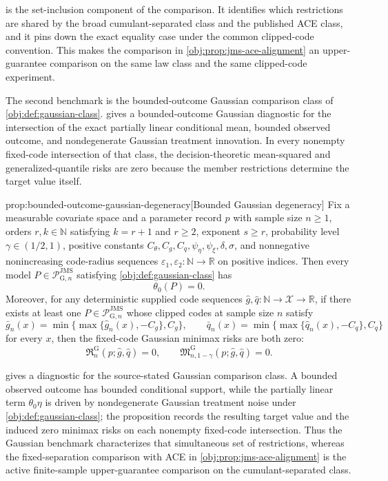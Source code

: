  is the set-inclusion component of the comparison. It identifies which restrictions are shared by the broad cumulant-separated class and the published ACE class, and it pins down the exact equality case under the common clipped-code convention. This makes the comparison in \cref{obj:prop:jms-ace-alignment} an upper-guarantee comparison on the same law class and the same clipped-code experiment.

The second benchmark is the bounded-outcome Gaussian comparison class of \cref{obj:def:gaussian-class}.  gives a bounded-outcome Gaussian diagnostic for the intersection of the exact partially linear conditional mean, bounded observed outcome, and nondegenerate Gaussian treatment innovation. In every nonempty fixed-code intersection of that class, the decision-theoretic mean-squared and generalized-quantile risks are zero because the member restrictions determine the target value itself.

\begin{propositionv}{prop:bounded-outcome-gaussian-degeneracy}[Bounded Gaussian degeneracy]
Fix a measurable covariate space and a parameter record \(p\) with sample size \(n\ge1\), orders \(r,k\in\mathbb N\) satisfying \(k=r+1\) and \(r\ge2\), exponent \(s\ge r\), probability level \(\gamma\in(1/2,1)\), positive constants \(C_{\theta},C_g,C_q,\psi_{\eta},\psi_{\xi},\delta,\sigma\), and nonnegative nonincreasing code-radius sequences \(\varepsilon_1,\varepsilon_2:\mathbb N\to\mathbb R\) on positive indices. Then every model \(P\in\mathcal P_{\mathrm G,n}^{\mathrm{JMS}}\) satisfying \cref{obj:def:gaussian-class} has
\[
\theta_0(P)=0.
\]
Moreover, for any deterministic supplied code sequences \(\widehat g,\widehat q:\mathbb N\to\mathcal X\to\mathbb R\), if there exists at least one \(P\in\mathcal P_{\mathrm G,n}^{\mathrm{JMS}}\) whose clipped codes at sample size \(n\) satisfy
\[
\bar g_n(x)=\min\{\max\{\widehat g_n(x),-C_g\},C_g\},
\qquad
\bar q_n(x)=\min\{\max\{\widehat q_n(x),-C_q\},C_q\}
\]
for every \(x\), then the fixed-code Gaussian minimax risks are both zero:
\[
\mathfrak R_n^{\mathrm G}(p;\widehat g,\widehat q)=0,
\qquad
\mathfrak M_{n,1-\gamma}^{\mathrm G}(p;\widehat g,\widehat q)=0.
\]
\end{propositionv}

 gives a diagnostic for the source-stated Gaussian comparison class. A bounded observed outcome has bounded conditional support, while the partially linear term \(\theta_0\eta\) is driven by nondegenerate Gaussian treatment noise under \cref{obj:def:gaussian-class}; the proposition records the resulting target value and the induced zero minimax risks on each nonempty fixed-code intersection. Thus the Gaussian benchmark characterizes that simultaneous set of restrictions, whereas the fixed-separation comparison with ACE in \cref{obj:prop:jms-ace-alignment} is the active finite-sample upper-guarantee comparison on the cumulant-separated class.

